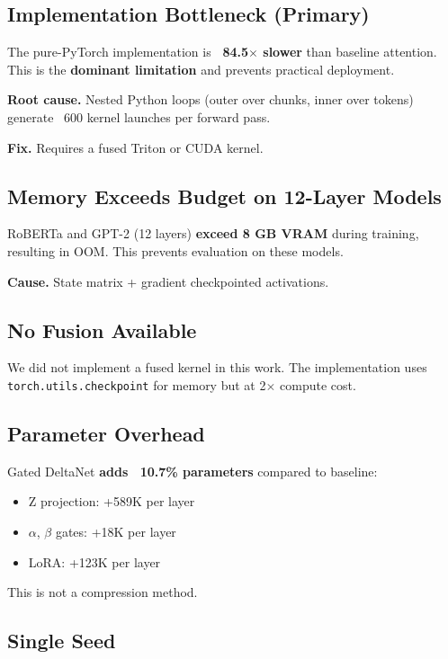\subsection{Implementation Bottleneck (Primary)}

The pure-PyTorch implementation is \textbf{~84.5$\times$ slower} than baseline 
attention. This is the \textbf{dominant limitation} and prevents practical 
deployment.

\textbf{Root cause.} Nested Python loops (outer over chunks, inner over tokens) 
generate ~600 kernel launches per forward pass.

\textbf{Fix.} Requires a fused Triton or CUDA kernel.

\subsection{Memory Exceeds Budget on 12-Layer Models}

RoBERTa and GPT-2 (12 layers) \textbf{exceed 8 GB VRAM} during training, 
resulting in OOM. This prevents evaluation on these models.

\textbf{Cause.} State matrix + gradient checkpointed activations.

\subsection{No Fusion Available}

We did not implement a fused kernel in this work. The implementation uses 
\texttt{torch.utils.checkpoint} for memory but at 2$\times$ compute cost.

\subsection{Parameter Overhead}

Gated DeltaNet \textbf{adds ~10.7\% parameters} compared to baseline:
\begin{itemize}
\item Z projection: +589K per layer
\item $\alpha$, $\beta$ gates: +18K per layer
\item LoRA: +123K per layer

\end{itemize}
This is not a compression method.

\subsection{Single Seed}

